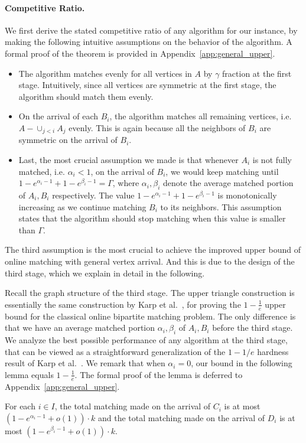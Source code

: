\paragraph{Competitive Ratio.} 
We first derive the stated competitive ratio of any algorithm for our instance, by making the following intuitive assumptions on the behavior of the algorithm. A formal proof of the theorem is provided in Appendix~\ref{app:general_upper}. 
\begin{itemize}
\item The algorithm matches evenly for all vertices in $A$ by $\gamma$ fraction at the first stage. Intuitively, since all vertices are symmetric at the first stage, the algorithm should match them evenly.
\item On the arrival of each $B_i$, the algorithm matches all remaining vertices, i.e. $A - \cup_{j <i} A_j$ evenly. This is again because all the neighbors of $B_i$ are symmetric on the arrival of $B_i$.
\item Last, the most crucial assumption we made is that whenever $A_i$ is not fully matched, i.e. $\alpha_i < 1$, on the arrival of $B_i$, we would keep matching until $1-e^{\alpha_i-1} + 1 - e^{\beta_i-1} = \Gamma$, where $\alpha_i,\beta_i$ denote the average matched portion of $A_i,B_i$ respectively. The value $1-e^{\alpha_i-1} + 1 - e^{\beta_i-1}$ is monotonically increasing as we continue matching $B_i$ to its neighbors. This assumption states that the algorithm should stop matching when this value is smaller than $\Gamma$.
\end{itemize}

The third assumption is the most crucial to achieve the improved upper bound of online matching with general vertex arrival. And this is due to the design of the third stage, which we explain in detail in the following. 

Recall the graph structure of the third stage. The upper triangle construction is essentially the same construction by Karp et al.~\cite{stoc/KarpVV90}, for proving the $1-\frac{1}{e}$ upper bound for the classical online bipartite matching problem. The only difference is that we have an average matched portion $\alpha_i,\beta_i$ of $A_i, B_i$ before the third stage. We analyze the best possible performance of any algorithm at the third stage, that can be viewed as a straightforward generalization of the $1-1/e$ hardness result of Karp et al.~\cite{stoc/KarpVV90}. We remark that when $\alpha_i=0$, our bound in the following lemma equals $1-\frac{1}{e}$. The formal proof of the lemma is deferred to Appendix~\ref{app:general_upper}.
\begin{lemma}
For each $i \in I$, the total matching made on the arrival of $C_i$ is at most $\left( 1-e^{\alpha_i-1} + o(1) \right) \cdot k$ and the total matching made on the arrival of $D_i$ is at most $\left( 1-e^{\beta_i-1} + o(1) \right) \cdot k$.
\end{lemma}

